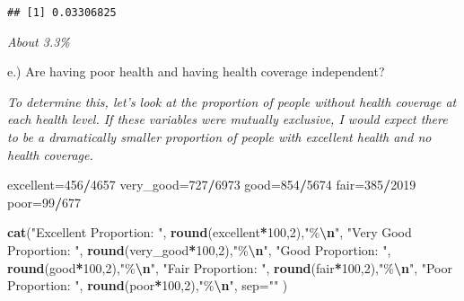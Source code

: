 \documentclass[
]{article}
\newenvironment{Shaded}{\begin{snugshade}}{\end{snugshade}}
\newcommand{\AttributeTok}[1]{\textcolor[rgb]{0.13,0.29,0.53}{#1}}
\newcommand{\DecValTok}[1]{\textcolor[rgb]{0.00,0.00,0.81}{#1}}
\newcommand{\FunctionTok}[1]{\textcolor[rgb]{0.13,0.29,0.53}{\textbf{#1}}}
\newcommand{\NormalTok}[1]{#1}
\newcommand{\OtherTok}[1]{\textcolor[rgb]{0.56,0.35,0.01}{#1}}
\newcommand{\SpecialCharTok}[1]{\textcolor[rgb]{0.81,0.36,0.00}{\textbf{#1}}}
\newcommand{\StringTok}[1]{\textcolor[rgb]{0.31,0.60,0.02}{#1}}
\begin{document}
\begin{verbatim}
## [1] 0.03306825
\end{verbatim}

\emph{About 3.3\%}

e.) Are having poor health and having health coverage independent?

\emph{To determine this, let's look at the proportion of people without
health coverage at each health level. If these variables were mutually
exclusive, I would expect there to be a dramatically smaller proportion
of people with excellent health and no health coverage.}

\begin{Shaded}
\begin{Highlighting}[]
\NormalTok{excellent}\OtherTok{=}\DecValTok{456}\SpecialCharTok{/}\DecValTok{4657}
\NormalTok{very\_good}\OtherTok{=}\DecValTok{727}\SpecialCharTok{/}\DecValTok{6973}
\NormalTok{good}\OtherTok{=}\DecValTok{854}\SpecialCharTok{/}\DecValTok{5674}
\NormalTok{fair}\OtherTok{=}\DecValTok{385}\SpecialCharTok{/}\DecValTok{2019}
\NormalTok{poor}\OtherTok{=}\DecValTok{99}\SpecialCharTok{/}\DecValTok{677}

\FunctionTok{cat}\NormalTok{(}\StringTok{"Excellent Proportion: "}\NormalTok{, }\FunctionTok{round}\NormalTok{(excellent}\SpecialCharTok{*}\DecValTok{100}\NormalTok{,}\DecValTok{2}\NormalTok{),}\StringTok{"\%}\SpecialCharTok{\textbackslash{}n}\StringTok{"}\NormalTok{, }
    \StringTok{"Very Good Proportion: "}\NormalTok{, }\FunctionTok{round}\NormalTok{(very\_good}\SpecialCharTok{*}\DecValTok{100}\NormalTok{,}\DecValTok{2}\NormalTok{),}\StringTok{"\%}\SpecialCharTok{\textbackslash{}n}\StringTok{"}\NormalTok{,}
    \StringTok{"Good Proportion: "}\NormalTok{, }\FunctionTok{round}\NormalTok{(good}\SpecialCharTok{*}\DecValTok{100}\NormalTok{,}\DecValTok{2}\NormalTok{),}\StringTok{"\%}\SpecialCharTok{\textbackslash{}n}\StringTok{"}\NormalTok{,}
    \StringTok{"Fair Proportion: "}\NormalTok{, }\FunctionTok{round}\NormalTok{(fair}\SpecialCharTok{*}\DecValTok{100}\NormalTok{,}\DecValTok{2}\NormalTok{),}\StringTok{"\%}\SpecialCharTok{\textbackslash{}n}\StringTok{"}\NormalTok{,}
    \StringTok{"Poor Proportion: "}\NormalTok{, }\FunctionTok{round}\NormalTok{(poor}\SpecialCharTok{*}\DecValTok{100}\NormalTok{,}\DecValTok{2}\NormalTok{),}\StringTok{"\%}\SpecialCharTok{\textbackslash{}n}\StringTok{"}\NormalTok{,}
    \AttributeTok{sep=}\StringTok{""}
\NormalTok{    )}
\end{Highlighting}
\end{Shaded}
\end{document}

